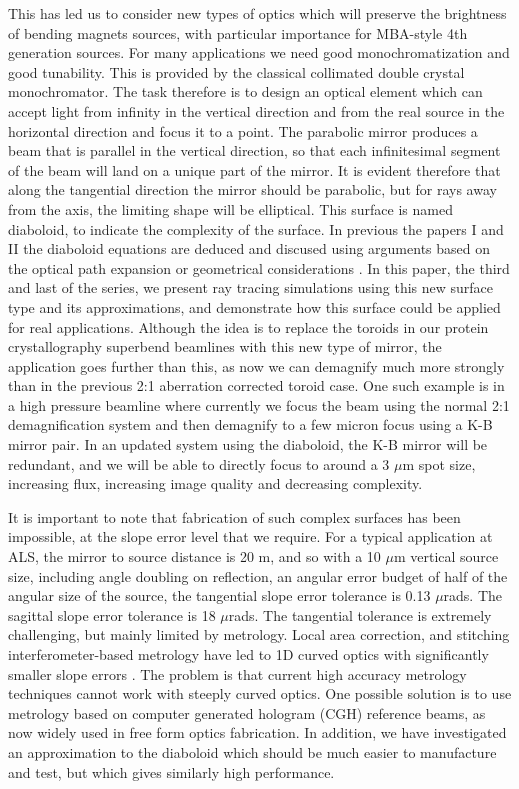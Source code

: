 \documentclass{iucr}              %
\newcommand{\inred}[1]{{\color{red}#1}}
\begin{document}
This has led us to consider new types of optics which will preserve the brightness of bending magnets sources, with particular importance for MBA-style 4th generation sources.   
For many applications we need good monochromatization and good tunability.  This is provided by the classical collimated double crystal monochromator.  The task therefore is to design an optical element which can accept light from infinity in the vertical direction and from the real source in the horizontal direction and focus it to a point.  The parabolic mirror produces a beam that is parallel in the vertical direction, so that each infinitesimal segment of the beam will land on a unique part of the mirror.  It is evident therefore that along the tangential direction the mirror should be parabolic, but for rays away from the axis, the limiting shape will be elliptical. \inred{This surface is named diaboloid, to indicate the complexity of the surface. In previous the papers I \cite{part1} and II \cite{part2} the diaboloid equations are deduced and discused using arguments based on the optical path expansion \cite{part1} or geometrical considerations \cite{part2}. In this paper, the third and last of the series,  we present ray tracing simulations using this new surface type and its approximations, and demonstrate how this surface could be applied for real applications. }
Although the idea is to replace the toroids in our protein crystallography superbend beamlines with this new type of mirror, the application goes further than this, as now we can demagnify much more strongly than in the previous 2:1 aberration corrected toroid case.  One such example is in a high pressure beamline where currently we focus the beam using the normal 2:1 demagnification system and then demagnify to a few micron focus using a K-B mirror pair.  In an updated system using the diaboloid, the K-B mirror will be redundant, and we will be able to directly focus to around a 3 $\mu$m spot size, increasing flux, increasing image quality and decreasing complexity.

It is important to note that fabrication of such complex surfaces has been impossible, at the slope error level that we require.  For a typical application at ALS, the mirror to source distance is 20 m, and so with a 10 $\mu$m vertical source size, including angle doubling on reflection, an angular error budget of half of the angular size of the source, the tangential slope error tolerance is 0.13 $\mu$rads.  The sagittal slope error tolerance is 18 $\mu$rads.  The tangential tolerance is extremely challenging, but mainly limited by metrology.  Local area correction, and stitching interferometer-based metrology have led to 1D curved optics with significantly smaller slope errors \cite{Yamauchi2002}.  The problem is that current high accuracy metrology techniques cannot work with steeply curved optics.  One possible solution is to use metrology based on computer generated hologram (CGH) reference beams, as now widely used in free form optics fabrication. In addition, we have investigated an approximation to the diaboloid which should be much easier to manufacture and test, but which gives similarly high performance. 
\end{document}
